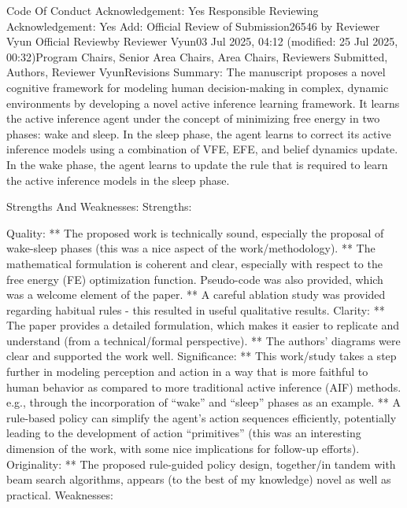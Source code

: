 Code Of Conduct Acknowledgement: Yes
Responsible Reviewing Acknowledgement: Yes
Add:
Official Review of Submission26546 by Reviewer Vyun
Official Reviewby Reviewer Vyun03 Jul 2025, 04:12 (modified: 25 Jul 2025, 00:32)Program Chairs, Senior Area Chairs, Area Chairs, Reviewers Submitted, Authors, Reviewer VyunRevisions
Summary:
The manuscript proposes a novel cognitive framework for modeling human decision-making in complex, dynamic environments by developing a novel active inference learning framework. It learns the active inference agent under the concept of minimizing free energy in two phases: wake and sleep. In the sleep phase, the agent learns to correct its active inference models using a combination of VFE, EFE, and belief dynamics update. In the wake phase, the agent learns to update the rule that is required to learn the active inference models in the sleep phase.

Strengths And Weaknesses:
Strengths:

Quality: ** The proposed work is technically sound, especially the proposal of wake-sleep phases (this was a nice aspect of the work/methodology). ** The mathematical formulation is coherent and clear, especially with respect to the free energy (FE) optimization function. Pseudo-code was also provided, which was a welcome element of the paper. ** A careful ablation study was provided regarding habitual rules - this resulted in useful qualitative results.
Clarity: ** The paper provides a detailed formulation, which makes it easier to replicate and understand (from a technical/formal perspective). ** The authors' diagrams were clear and supported the work well.
Significance: ** This work/study takes a step further in modeling perception and action in a way that is more faithful to human behavior as compared to more traditional active inference (AIF) methods. e.g., through the incorporation of “wake” and “sleep” phases as an example. ** A rule-based policy can simplify the agent’s action sequences efficiently, potentially leading to the development of action “primitives” (this was an interesting dimension of the work, with some nice implications for follow-up efforts).
Originality: ** The proposed rule-guided policy design, together/in tandem with beam search algorithms, appears (to the best of my knowledge) novel as well as practical.
Weaknesses:

